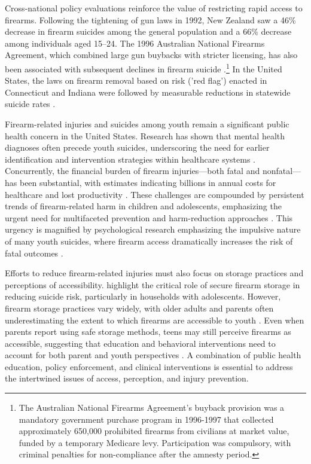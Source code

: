 Cross-national policy evaluations reinforce the value of restricting rapid access to firearms. Following the tightening of gun laws in 1992, New Zealand saw a 46\% decrease in firearm suicides among the general population and a 66\% decrease among individuals aged 15–24\autocite{beautrais2006firearms}. The 1996 Australian National Firearms Agreement, which combined large gun buybacks with stricter licensing, has also been associated with subsequent declines in firearm suicide \autocite{bakerGunLawsSudden2007}.\footnote{The Australian National Firearms Agreement's buyback provision was a mandatory government purchase program in 1996-1997 that collected approximately 650,000 prohibited firearms from civilians at market value, funded by a temporary Medicare levy. Participation was compulsory, with criminal penalties for non-compliance after the amnesty period.} In the United States, the laws on firearm removal based on risk ('red flag') enacted in Connecticut and Indiana were followed by measurable reductions in statewide suicide rates \autocite{kivisto2018effects}.

Firearm-related injuries and suicides among youth remain a significant public health concern in the United States. Research has shown that mental health diagnoses often precede youth suicides, underscoring the need for earlier identification and intervention strategies within healthcare systems \autocite{chaudhary2024youth}. Concurrently, the financial burden of firearm injuries—both fatal and nonfatal—has been substantial, with estimates indicating billions in annual costs for healthcare and lost productivity \autocite{miller2024costs}. These challenges are compounded by persistent trends of firearm-related harm in children and adolescents, emphasizing the urgent need for multifaceted prevention and harm-reduction approaches \autocite{lee2022firearm, kaufman2021epidemiologic}. This urgency is magnified by psychological research emphasizing the impulsive nature of many youth suicides, where firearm access dramatically increases the risk of fatal outcomes \autocite{anestis2014impulsivity, mcgirr2008impulsive}.


Efforts to reduce firearm-related injuries must also focus on storage practices and perceptions of accessibility. \textcite{miller2025firearm} highlight the critical role of secure firearm storage in reducing suicide risk, particularly in households with adolescents. However, firearm storage practices vary widely, with older adults and parents often underestimating the extent to which firearms are accessible to youth \autocite{carter2022firearm, hastings2025parental}. Even when parents report using safe storage methods, teens may still perceive firearms as accessible, suggesting that education and behavioral interventions need to account for both parent and youth perspectives \autocite{hastings2025parental}. A combination of public health education, policy enforcement, and clinical interventions is essential to address the intertwined issues of access, perception, and injury prevention.

